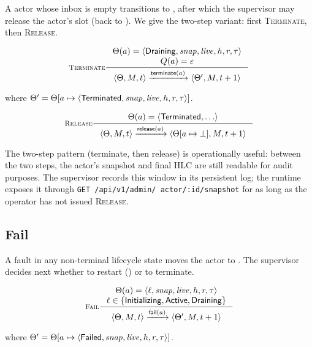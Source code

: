 A \Draining{} actor whose inbox is empty transitions to
\Terminated{}, after which the supervisor may release the actor's
slot (back to \Dormant{}).  We give the two-step variant: first
\textsc{Terminate}, then \textsc{Release}.

\begin{equation}
\inference[\textsc{Terminate}]
{
  \Theta(a) = \langle \Draining{}, \mathit{snap}, \mathit{live},
                       h, r, \tau\rangle \\
  Q(a) = \varepsilon
}
{
  \langle \Theta, M, t\rangle
  \trans{\mathsf{terminate}(a)}
  \langle \Theta', M, t+1\rangle
}
\end{equation}

\noindent where
\(\Theta' = \Theta[a \mapsto
  \langle \mathsf{Terminated}{}, \mathit{snap}, \mathit{live},
          h, r, \tau\rangle]\).

\begin{equation}
\inference[\textsc{Release}]
{
  \Theta(a) = \langle \Terminated{}, \ldots\rangle
}
{
  \langle \Theta, M, t\rangle
  \trans{\mathsf{release}(a)}
  \langle \Theta[a \mapsto \bot], M, t+1\rangle
}
\end{equation}

The two-step pattern (terminate, then release) is operationally
useful: between the two steps, the actor's snapshot and final HLC
are still readable for audit purposes.  The supervisor records this
window in its persistent log; the runtime exposes it through
\texttt{GET\ /api/\allowbreak v1/\allowbreak admin/\allowbreak
actor/:id/\allowbreak snapshot} for as long as the operator has not
issued \textsc{Release}.

\subsection{Fail}
\label{rule:fail}

A fault in any non-terminal lifecycle state moves the actor to
\Failed{}.  The supervisor decides next whether to restart
() or to terminate.

\begin{equation}
\inference[\textsc{Fail}]
{
  \Theta(a) = \langle \ell, \mathit{snap}, \mathit{live}, h, r, \tau\rangle \\
  \ell \in \{\Initializing{}, \Active{}, \Draining{}\}
}
{
  \langle \Theta, M, t\rangle
  \trans{\mathsf{fail}(a)}
  \langle \Theta', M, t+1\rangle
}
\end{equation}

\noindent where
\(\Theta' = \Theta[a \mapsto
  \langle \mathsf{Failed}{}, \mathit{snap}, \mathit{live}, h, r, \tau\rangle]\).

